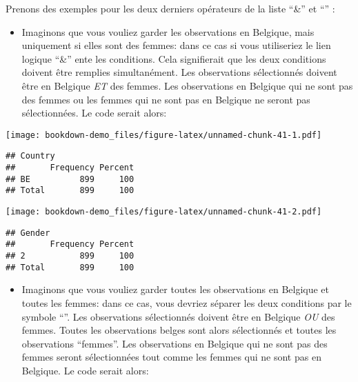 \documentclass[
]{book}
\newenvironment{Shaded}{\begin{snugshade}}{\end{snugshade}}
\newcommand{\CommentTok}[1]{\textcolor[rgb]{0.56,0.35,0.01}{\textit{#1}}}
\newcommand{\DecValTok}[1]{\textcolor[rgb]{0.00,0.00,0.81}{#1}}
\newcommand{\FunctionTok}[1]{\textcolor[rgb]{0.00,0.00,0.00}{#1}}
\newcommand{\NormalTok}[1]{#1}
\newcommand{\OtherTok}[1]{\textcolor[rgb]{0.56,0.35,0.01}{#1}}
\newcommand{\SpecialCharTok}[1]{\textcolor[rgb]{0.00,0.00,0.00}{#1}}
\newcommand{\StringTok}[1]{\textcolor[rgb]{0.31,0.60,0.02}{#1}}
\providecommand{\tightlist}{%
  \setlength{\itemsep}{0pt}\setlength{\parskip}{0pt}}
\begin{document}
Prenons des exemples pour les deux derniers opérateurs de la liste ``\&'' et ``\textbar{}'' :

\begin{itemize}
\tightlist
\item
  Imaginons que vous vouliez garder les observations en Belgique, mais uniquement si elles sont des femmes: dans ce cas si vous utiliseriez le lien logique ``\&'' ente les conditions. Cela signifierait que les deux conditions doivent être remplies simultanément. Les observations sélectionnés doivent être en Belgique \emph{ET} des femmes. Les observations en Belgique qui ne sont pas des femmes ou les femmes qui ne sont pas en Belgique ne seront pas sélectionnées. Le code serait alors:
\end{itemize}

\begin{Shaded}
\end{Shaded}

\texttt{[image: bookdown-demo\_files/figure-latex/unnamed-chunk-41-1.pdf]}

\begin{verbatim}
## Country 
##       Frequency Percent
## BE          899     100
## Total       899     100
\end{verbatim}

\begin{Shaded}
\end{Shaded}

\texttt{[image: bookdown-demo\_files/figure-latex/unnamed-chunk-41-2.pdf]}

\begin{verbatim}
## Gender 
##       Frequency Percent
## 2           899     100
## Total       899     100
\end{verbatim}

\begin{itemize}
\tightlist
\item
  Imaginons que vous vouliez garder toutes les observations en Belgique et toutes les femmes: dans ce cas, vous devriez séparer les deux conditions par le symbole ``\textbar{}''. Les observations sélectionnés doivent être en Belgique \emph{OU} des femmes. Toutes les observations belges sont alors sélectionnés et toutes les observations ``femmes''. Les observations en Belgique qui ne sont pas des femmes seront sélectionnées tout comme les femmes qui ne sont pas en Belgique. Le code serait alors:
\end{itemize}
\end{document}
